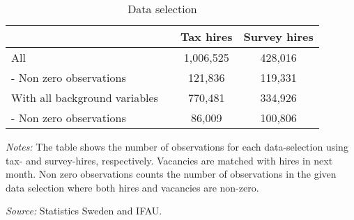 \begin{table}[htbp]\centering
\begin{threeparttable}
\def\sym#1{\ifmmode^{#1}\else\(^{#1}\)\fi}
\caption{Data selection}
\label{tab:data_selection}
\begin{tabularx}{\textwidth}{lXcc}
\hline\hline
                &&\multicolumn{1}{c}{Tax hires}&\multicolumn{1}{c}{Survey hires} \\
\hline

\hline

All && 1,006,525 &  428,016\\
- Non zero observations && 121,836 & 119,331  \\
With all background variables && 770,481 & 334,926 \\
- Non zero observations &&86,009 & 100,806 \\

\hline\hline
\end{tabularx}

\begin{tablenotes}
\item \footnotesize{ \emph{Notes:} The table shows the number of observations for each data-selection using tax- and survey-hires, respectively. Vacancies are matched with hires in next month. Non zero observations counts the number of observations in the given data selection where both hires and vacancies are non-zero.}
\item \footnotesize{ \emph{Source:} Statistics Sweden and IFAU. }
\end{tablenotes}
\end{threeparttable}
\end{table}
